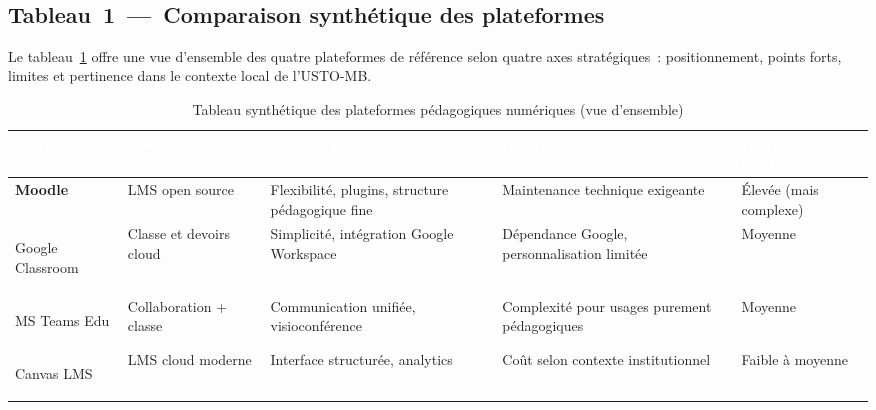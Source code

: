 ﻿﻿\documentclass[12pt,a4paper,oneside]{report}
\begin{document}
\subsection{Tableau~1~---~Comparaison synth\'etique des plateformes}

Le tableau~\ref{tab:compar_synth} offre une vue d'ensemble des quatre plateformes de r\'ef\'erence selon quatre axes strat\'egiques~: positionnement, points forts, limites et pertinence dans le contexte local de l'USTO-MB.

\renewcommand{\arraystretch}{1.8}
{\setlength{\tabcolsep}{7pt}
\begin{table}[H]
\centering
\caption{Tableau synth\'etique des plateformes p\'edagogiques num\'eriques (vue d'ensemble)}
\label{tab:compar_synth}
\begin{tabular}{|>{\bfseries}p{2.3cm}|p{2.5cm}|p{3.2cm}|p{3.0cm}|p{2.2cm}|}

\hline
\rowcolor{ustoblue}
\textcolor{white}{\textbf{Plateforme}} &
\textcolor{white}{\textbf{Positionnement}} &
\textcolor{white}{\textbf{Points forts}} &
\textcolor{white}{\textbf{Limites}} &
\textcolor{white}{\textbf{Pertinence locale}} \\
\hline

\rowcolor{ustolightblue!40}
Moodle &
LMS open source &
Flexibilit\'e, plugins, structure p\'edagogique fine &
Maintenance technique exigeante &
\'Elev\'ee (mais complexe) \\
\hline

\rowcolor{rowgray}
Google Classroom &
Classe et devoirs cloud &
Simplicit\'e, int\'egration Google Workspace &
D\'ependance Google, personnalisation limit\'ee &
Moyenne \\
\hline

\rowcolor{ustolightblue!40}
MS Teams Edu &
Collaboration + classe &
Communication unifi\'ee, visioconf\'erence &
Complexit\'e pour usages purement p\'edagogiques &
Moyenne \\
\hline

\rowcolor{rowgray}
Canvas LMS &
LMS cloud moderne &
Interface structur\'ee, analytics &
Co\^ut selon contexte institutionnel &
Faible \`a moyenne \\
\hline

\end{tabular}
\end{table}}
\end{document}
